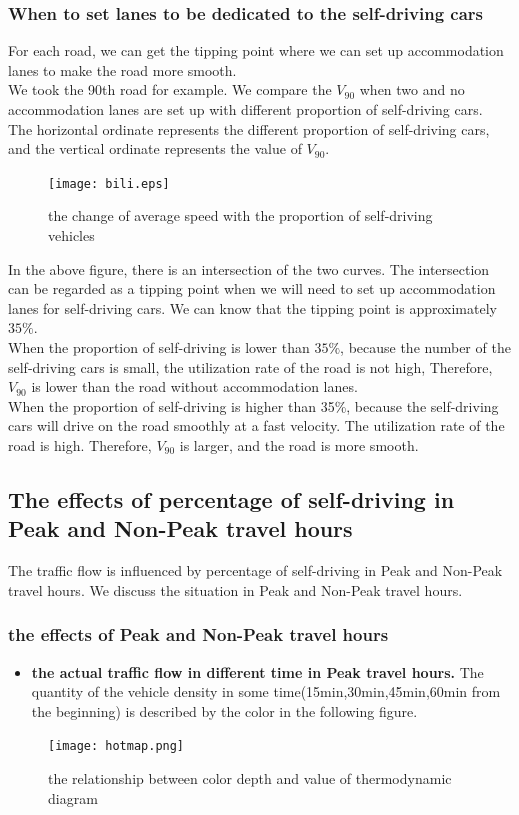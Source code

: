 \documentclass{mcmthesis}
\begin{document}
\subsubsection{When to set lanes to be dedicated to the self-driving cars}
\indent For each road, we can get the tipping point where we can set up accommodation lanes to make the road more smooth.\\
\indent We took the 90th road for example. We compare the $V_{90}$ when two and no accommodation lanes are set up with different proportion of self-driving cars.\\
\indent The horizontal ordinate represents the different proportion of self-driving cars, and the vertical ordinate represents the value of $V_{90}$.\\
\begin{figure}[H]
	\centerline{\texttt{[image: bili.eps]}}
	\caption{the change of average speed with the proportion of self-driving vehicles}	
\end{figure}
\indent In the above figure, there is an intersection of the two curves. The intersection can be regarded as a tipping point when we will need to set up accommodation lanes for self-driving cars. We can know that the tipping point is approximately $35\%$.\\
\indent When the proportion of self-driving is lower than $35\%$, because the number of the self-driving cars is small, the utilization rate of the road is not high, Therefore, $V_{90}$ is lower than the road without accommodation lanes. \\
\indent When the proportion of self-driving is higher than 35\%, because the self-driving cars will drive on the road smoothly at a fast velocity. The utilization rate of the road is high. Therefore, $V_{90}$ is larger, and the road is more smooth.\\
\subsection{The effects of percentage of self-driving in Peak and Non-Peak travel hours}
The traffic flow is influenced by percentage of self-driving in Peak and Non-Peak travel hours. We discuss the situation in Peak and Non-Peak travel hours. 
\subsubsection{the effects of Peak and Non-Peak travel hours}
\begin{itemize}
\item{\textbf{the actual traffic flow in different time in Peak travel hours.} The quantity of the vehicle density in some time(15min,30min,45min,60min from the beginning) is described by the color in the following figure. }
\end{itemize}
\begin{figure}[H]
	\centerline{\texttt{[image: hotmap.png]}}
	\caption{the relationship between color depth and value of thermodynamic diagram}	
\end{figure}
\end{document}
